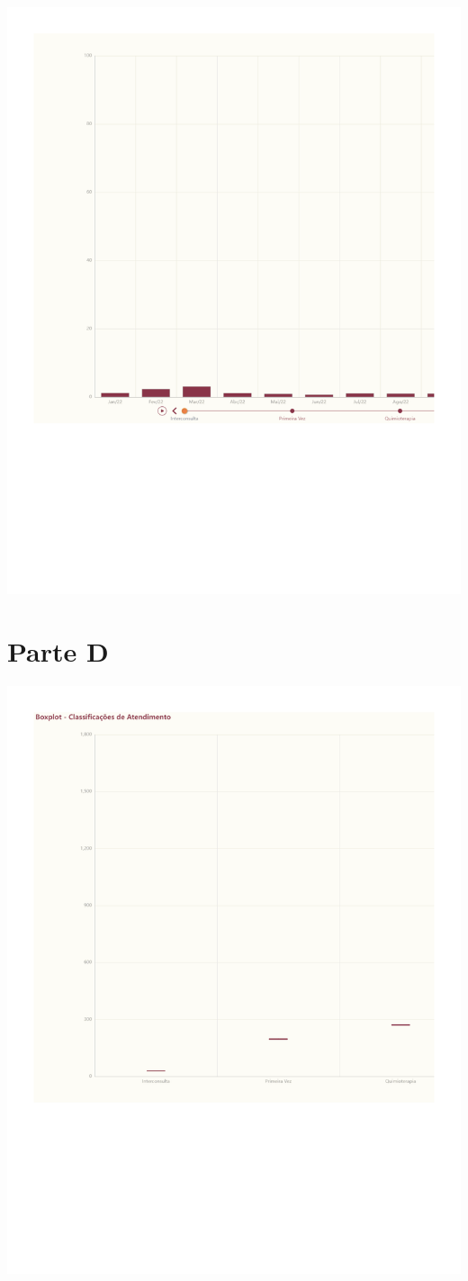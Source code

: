 \documentclass[
  letterpaper,
  DIV=11,
  numbers=noendperiod]{scrreprt}
\begin{document}
\includegraphics{2022_files/figure-pdf/unnamed-chunk-8-1.pdf}

\section{Parte D}

\includegraphics{2022_files/figure-pdf/unnamed-chunk-9-1.pdf}
\end{document}
